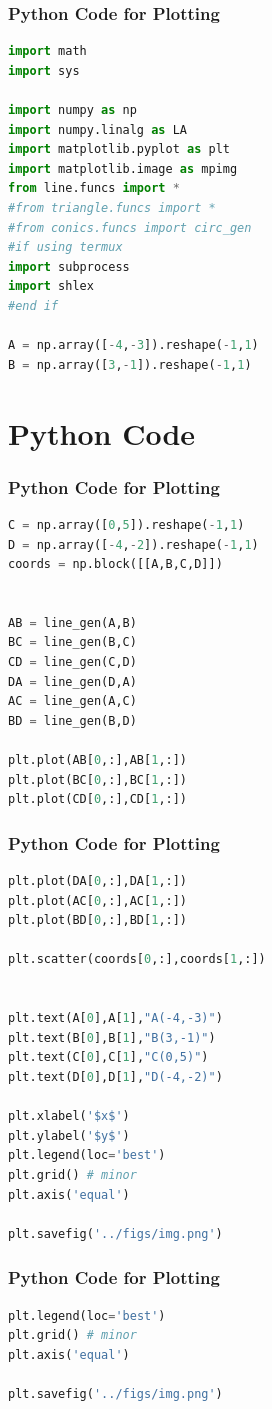 \documentclass{beamer}
\theoremstyle{remark}
\numberwithin{equation}{section}
\begin{document}
\begin{frame}[fragile]
\frametitle{Python Code for Plotting}
\begin{lstlisting}[language=Python]
import math
import sys   

import numpy as np
import numpy.linalg as LA
import matplotlib.pyplot as plt
import matplotlib.image as mpimg
from line.funcs import *
#from triangle.funcs import *
#from conics.funcs import circ_gen
#if using termux
import subprocess
import shlex
#end if

A = np.array([-4,-3]).reshape(-1,1)
B = np.array([3,-1]).reshape(-1,1)


\end{lstlisting}

\end{frame}
\section{Python Code}
\begin{frame}[fragile]
\frametitle{Python Code for Plotting}
\begin{lstlisting}[language=Python]
C = np.array([0,5]).reshape(-1,1)
D = np.array([-4,-2]).reshape(-1,1)
coords = np.block([[A,B,C,D]])


AB = line_gen(A,B)
BC = line_gen(B,C)
CD = line_gen(C,D)
DA = line_gen(D,A)
AC = line_gen(A,C)
BD = line_gen(B,D)

plt.plot(AB[0,:],AB[1,:])
plt.plot(BC[0,:],BC[1,:])
plt.plot(CD[0,:],CD[1,:])

\end{lstlisting}

\end{frame}
\begin{frame}[fragile]
\frametitle{Python Code for Plotting}
\begin{lstlisting}[language=Python]
plt.plot(DA[0,:],DA[1,:])
plt.plot(AC[0,:],AC[1,:])
plt.plot(BD[0,:],BD[1,:])

plt.scatter(coords[0,:],coords[1,:])


plt.text(A[0],A[1],"A(-4,-3)")
plt.text(B[0],B[1],"B(3,-1)")
plt.text(C[0],C[1],"C(0,5)")
plt.text(D[0],D[1],"D(-4,-2)")

plt.xlabel('$x$')
plt.ylabel('$y$')
plt.legend(loc='best')
plt.grid() # minor
plt.axis('equal')

plt.savefig('../figs/img.png')


\end{lstlisting}

\end{frame}
\begin{frame}[fragile]
\frametitle{Python Code for Plotting}
\begin{lstlisting}[language=Python]
plt.legend(loc='best')
plt.grid() # minor
plt.axis('equal')

plt.savefig('../figs/img.png')

\end{lstlisting}

\end{frame}
\end{document}
